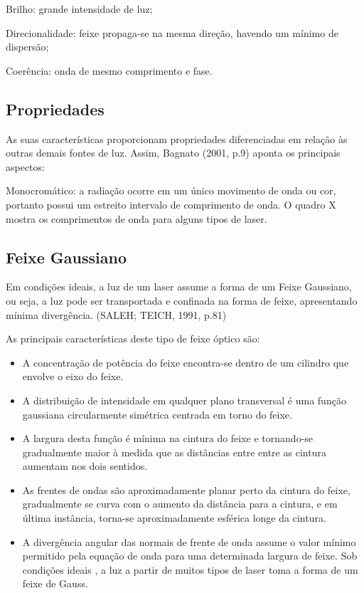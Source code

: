 \documentclass{fei}
\begin{document}
Brilho: grande intensidade de luz;

Direcionalidade: feixe propaga-se na mesma direção, havendo um mínimo de dispersão;

Coerência: onda de mesmo comprimento e fase.

\subsection{Propriedades}

As suas características proporcionam propriedades diferenciadas em relação às outras demais fontes de luz. Assim, Bagnato (2001, p.9) aponta os principais aspectos:

Monocromático: a radiação ocorre em um único movimento de onda ou cor, portanto possui um estreito intervalo de comprimento de onda. O quadro X mostra os comprimentos de onda para alguns tipos de laser.

\subsection{Feixe Gaussiano}

Em condições ideais, a luz de um laser assume a forma de um Feixe Gaussiano, ou seja, a luz pode ser transportada e confinada na forma de feixe, apresentando mínima divergência. (SALEH; TEICH, 1991, p.81)

As principais características deste tipo de feixe óptico são:

\begin{itemize}
	\item A concentração de potência do feixe encontra-se dentro de um cilindro que envolve o eixo do feixe.
	\item A distribuição de intensidade em qualquer plano transversal é uma função gaussiana circularmente simétrica centrada em torno do feixe.
	\item A largura desta função é mínima na cintura do feixe e tornando-se gradualmente maior à medida que as distâncias entre entre as cintura aumentam nos dois sentidos.
	\item As frentes de ondas são aproximadamente planar perto da cintura do feixe, gradualmente se curva com o aumento da distância para a cintura, e em última instância, torna-se aproximadamente esférica longe da cintura.
	\item A divergência angular das normais de frente de onda assume o valor mínimo permitido pela equação de onda para uma determinada largura de feixe. Sob condições ideais , a luz a partir de muitos tipos de laser toma a forma de um feixe de Gauss.
\end{itemize}
\end{document}
